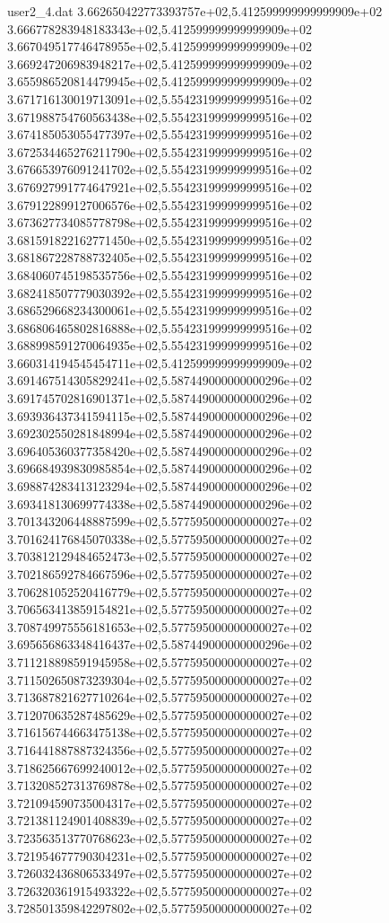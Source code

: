 \begin{filecontents}{user2_4.dat}
3.662650422773393757e+02,5.412599999999999909e+02
3.666778283948183343e+02,5.412599999999999909e+02
3.667049517746478955e+02,5.412599999999999909e+02
3.669247206983948217e+02,5.412599999999999909e+02
3.655986520814479945e+02,5.412599999999999909e+02
3.671716130019713091e+02,5.554231999999999516e+02
3.671988754760563438e+02,5.554231999999999516e+02
3.674185053055477397e+02,5.554231999999999516e+02
3.672534465276211790e+02,5.554231999999999516e+02
3.676653976091241702e+02,5.554231999999999516e+02
3.676927991774647921e+02,5.554231999999999516e+02
3.679122899127006576e+02,5.554231999999999516e+02
3.673627734085778798e+02,5.554231999999999516e+02
3.681591822162771450e+02,5.554231999999999516e+02
3.681867228788732405e+02,5.554231999999999516e+02
3.684060745198535756e+02,5.554231999999999516e+02
3.682418507779030392e+02,5.554231999999999516e+02
3.686529668234300061e+02,5.554231999999999516e+02
3.686806465802816888e+02,5.554231999999999516e+02
3.688998591270064935e+02,5.554231999999999516e+02
3.660314194545454711e+02,5.412599999999999909e+02
3.691467514305829241e+02,5.587449000000000296e+02
3.691745702816901371e+02,5.587449000000000296e+02
3.693936437341594115e+02,5.587449000000000296e+02
3.692302550281848994e+02,5.587449000000000296e+02
3.696405360377358420e+02,5.587449000000000296e+02
3.696684939830985854e+02,5.587449000000000296e+02
3.698874283413123294e+02,5.587449000000000296e+02
3.693418130699774338e+02,5.587449000000000296e+02
3.701343206448887599e+02,5.577595000000000027e+02
3.701624176845070338e+02,5.577595000000000027e+02
3.703812129484652473e+02,5.577595000000000027e+02
3.702186592784667596e+02,5.577595000000000027e+02
3.706281052520416779e+02,5.577595000000000027e+02
3.706563413859154821e+02,5.577595000000000027e+02
3.708749975556181653e+02,5.577595000000000027e+02
3.695656863348416437e+02,5.587449000000000296e+02
3.711218898591945958e+02,5.577595000000000027e+02
3.711502650873239304e+02,5.577595000000000027e+02
3.713687821627710264e+02,5.577595000000000027e+02
3.712070635287485629e+02,5.577595000000000027e+02
3.716156744663475138e+02,5.577595000000000027e+02
3.716441887887324356e+02,5.577595000000000027e+02
3.718625667699240012e+02,5.577595000000000027e+02
3.713208527313769878e+02,5.577595000000000027e+02
3.721094590735004317e+02,5.577595000000000027e+02
3.721381124901408839e+02,5.577595000000000027e+02
3.723563513770768623e+02,5.577595000000000027e+02
3.721954677790304231e+02,5.577595000000000027e+02
3.726032436806533497e+02,5.577595000000000027e+02
3.726320361915493322e+02,5.577595000000000027e+02
3.728501359842297802e+02,5.577595000000000027e+02

\end{filecontents}
